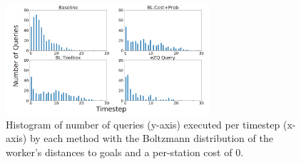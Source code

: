 \documentclass[letterpaper]{article}
\begin{document}
\begin{figure}[t]
\centering
\includegraphics[width=\linewidth,height=1.593in ]{Figures/Boltzmann_Positive_hist_c0_subfigures.png}
\caption{Histogram of number of queries (y-axis) executed per timestep (x-axis) by each method with the Boltzmann distribution of the worker's distances to goals and a per-station cost of 0.}
\label{fig:hist}
\end{figure}
\end{document}
